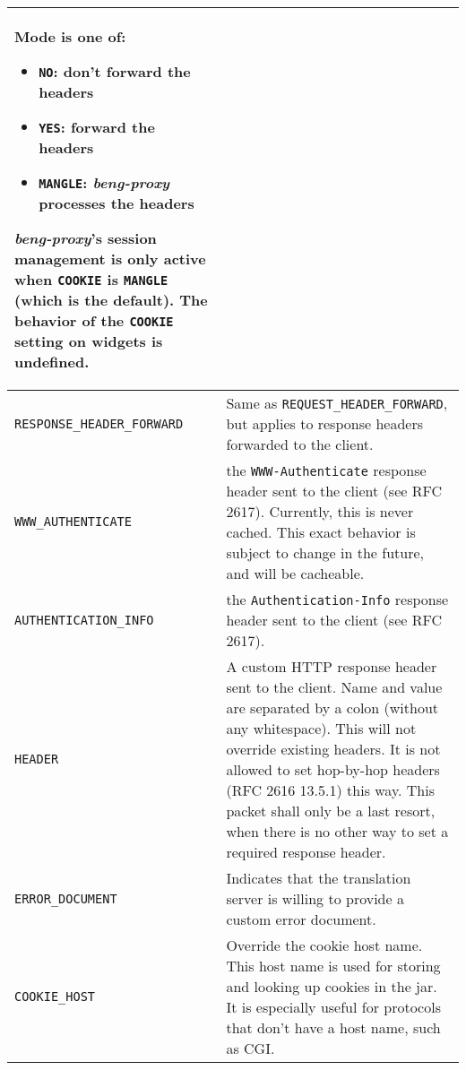\documentclass[a4paper,12pt]{article}
\begin{document}
\begin{longtable}{|l|p{8cm}|}
Mode is one of:

\begin{itemize}
\item \texttt{NO}: don't forward the headers
\item \texttt{YES}: forward the headers
\item \texttt{MANGLE}: \emph{beng-proxy} processes the headers
\end{itemize}

\emph{beng-proxy}'s session management is only active when
\texttt{COOKIE} is \texttt{MANGLE} (which is the default).  The
behavior of the \texttt{COOKIE} setting on widgets is undefined.

\\

\hline

\verb|RESPONSE_HEADER_FORWARD| &

Same as \verb|REQUEST_HEADER_FORWARD|, but applies to response
headers forwarded to the client. \\

\hline

\verb|WWW_AUTHENTICATE| & the \texttt{WWW-Authenticate} response
header sent to the client (see RFC 2617).  Currently, this is never
cached.  This exact behavior is subject to change in the future, and
will be cacheable. \\

\hline

\verb|AUTHENTICATION_INFO| & the \texttt{Authentication-Info}
response header sent to the client (see RFC 2617). \\

\hline

\verb|HEADER| & A custom HTTP response header sent to the client.
Name and value are separated by a colon (without any whitespace).
This will not override existing headers.  It is not allowed to set
hop-by-hop headers (RFC 2616 13.5.1) this way.  This packet shall only
be a last resort, when there is no other way to set a required
response header. \\

\hline

\verb|ERROR_DOCUMENT| & Indicates that the translation server is
willing to provide a custom error document. \\

\hline

\verb|COOKIE_HOST| & Override the cookie host name.  This host name
is used for storing and looking up cookies in the jar.  It is
especially useful for protocols that don't have a host name, such as
CGI. \\

\hline
\end{longtable}
\end{document}
